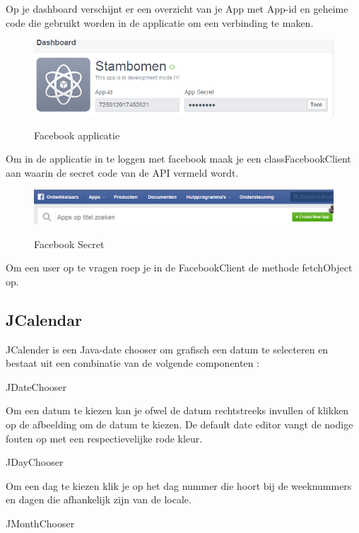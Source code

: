 \documentclass[pdftex,a4paper,12pt,twoside]{report}
\begin{document}
 Op je dashboard verschijnt er een overzicht van je App met App-id en geheime code die gebruikt worden in de applicatie om een verbinding te maken.
 
   \begin{figure}[!htb]
    \includegraphics{images/facebook3.png}\\
   \caption{Facebook applicatie}
   \end{figure}
 
Om in de applicatie in te loggen met facebook maak je een classFacebookClient aan waarin de secret code van de API vermeld wordt.

   \begin{figure}[!htb]
   \includegraphics{images/facebook4.png}\\
   \caption{Facebook Secret}
   \end{figure}

Om een user op te vragen roep je in de FacebookClient de methode fetchObject op.

 

\subsection{JCalendar}
JCalender is een Java-date chooser om grafisch een datum te selecteren en bestaat uit een combinatie van de volgende componenten :

JDateChooser

Om een datum te kiezen kan je ofwel de datum rechtstreeks invullen of klikken op de afbeelding om de datum te kiezen.
De default date editor vangt de nodige fouten op met een respectievelijke rode kleur.


JDayChooser

Om een dag te kiezen klik je op het dag nummer die hoort bij de weeknummers en dagen die afhankelijk zijn van de locale.



JMonthChooser
\end{document}
